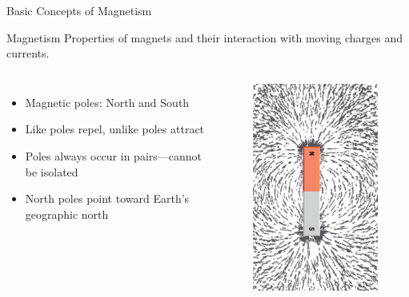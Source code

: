 \documentclass{beamer}
\begin{document}
\begin{frame}{Basic Concepts of Magnetism}
\begin{block}{Magnetism}
Properties of magnets and their interaction with moving charges and currents.
\end{block}

\begin{columns}
\begin{itemize}
\item Magnetic poles: North and South
\item Like poles repel, unlike poles attract
\item Poles always occur in pairs—cannot be isolated
\item North poles point toward Earth's geographic north
\end{itemize}

\begin{figure}
\centering
\includegraphics[width=0.8\linewidth]{phys12-magnetism-magnetic-field-generator.png}
\end{figure}
\end{columns}
\end{frame}
\end{document}
